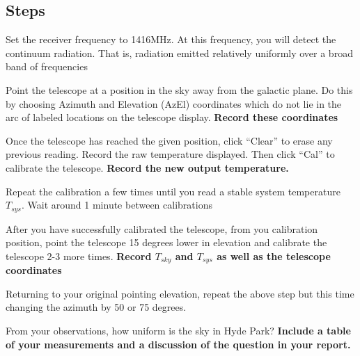 \subsection{Steps}
\begin{steps}
	\item Set the receiver frequency to 1416MHz. At this frequency, you will detect the continuum radiation. That is, radiation emitted relatively uniformly over a broad band of frequencies  
	
	\item Point the telescope at a position in the sky away from the galactic plane. Do this by choosing Azimuth and Elevation (AzEl) coordinates which do not lie in the arc of labeled locations on the telescope display. \textbf{Record these coordinates}
	
	\item Once the telescope has reached the given position, click ``Clear'' to erase any previous reading. Record the raw temperature displayed. Then click ``Cal'' to calibrate the telescope. \textbf{Record the new output temperature.} 
	
	\item Repeat the calibration a few times until you read a stable system temperature $T_{sys}$. Wait around 1 minute between calibrations
	
	\item After you have successfully calibrated the telescope, from you calibration position, point the telescope 15 degrees lower in elevation and calibrate the telescope 2-3 more times. \textbf{Record $T_{sky}$ and $T_{sys}$ as well as the telescope coordinates}
	
	\item Returning to your original pointing elevation, repeat the above step but this time changing the azimuth by 50 or 75 degrees.
	
	\item From your observations, how uniform is the sky in Hyde Park? \textbf{Include a table of your measurements and a discussion of the question in your report.}
\end{steps}